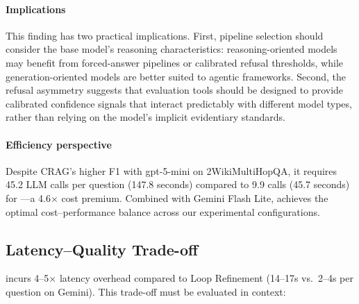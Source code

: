 \paragraph{Implications}
This finding has two practical implications.
First, pipeline selection should consider the base model's reasoning characteristics: reasoning-oriented models may benefit from forced-answer pipelines or calibrated refusal thresholds, while generation-oriented models are better suited to agentic frameworks.
Second, the refusal asymmetry suggests that evaluation tools should be designed to provide calibrated confidence signals that interact predictably with different model types, rather than relying on the model's implicit evidentiary standards.

\paragraph{Efficiency perspective}
Despite CRAG's higher F1 with gpt-5-mini on 2WikiMultiHopQA, it requires 45.2 LLM calls per question (147.8 seconds) compared to 9.9 calls (45.7 seconds) for \ours{}---a 4.6$\times$ cost premium.
Combined with Gemini Flash Lite, \ours{} achieves the optimal cost--performance balance across our experimental configurations.

\subsection{Latency--Quality Trade-off}
\label{subsec:tradeoff}

\ours{} incurs 4--5$\times$ latency overhead compared to Loop Refinement (14--17s vs.\ 2--4s per question on Gemini).
This trade-off must be evaluated in context:

